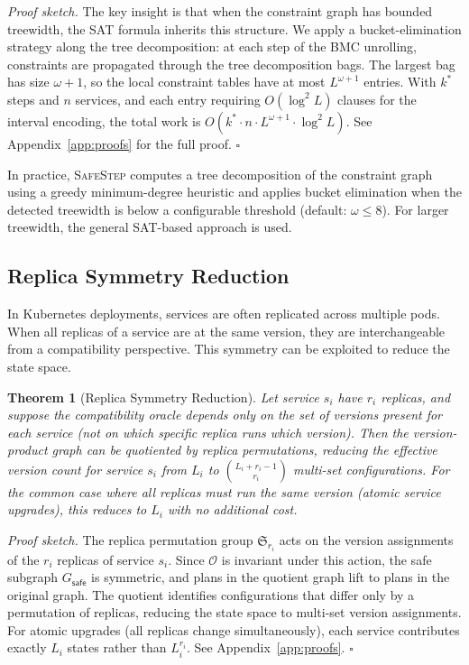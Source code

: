 \documentclass[10pt,twocolumn]{article}
\newtheorem{theorem}{Theorem}
\newcommand{\safestep}{\textsc{SafeStep}}
\begin{document}
\emph{Proof sketch.}
The key insight is that when the constraint graph has bounded
treewidth, the SAT formula inherits this structure. We apply
a bucket-elimination strategy along the tree decomposition:
at each step of the BMC unrolling, constraints are propagated
through the tree decomposition bags. The largest bag has size
$\omega + 1$, so the local constraint tables have at most
$L^{\omega+1}$ entries. With $k^{*}$ steps and $n$ services,
and each entry requiring $O(\log^{2} L)$ clauses for the
interval encoding, the total work is
$O(k^{*} \cdot n \cdot L^{\omega+1} \cdot \log^{2} L)$.
See Appendix~\ref{app:proofs} for the full proof.
\hfill$\square$

In practice, \safestep{} computes a tree decomposition of the
constraint graph using a greedy minimum-degree heuristic and
applies bucket elimination when the detected treewidth is below
a configurable threshold (default: $\omega \leq 8$). For larger
treewidth, the general SAT-based approach is used.

\subsection{Replica Symmetry Reduction}

In Kubernetes deployments, services are often replicated across
multiple pods. When all replicas of a service are at the same
version, they are interchangeable from a compatibility
perspective. This symmetry can be exploited to reduce the
state space.

\begin{theorem}[Replica Symmetry Reduction]
\label{thm:replica}
Let service $s_i$ have $r_i$ replicas, and suppose the
compatibility oracle depends only on the \emph{set} of
versions present for each service (not on which specific
replica runs which version). Then the version-product graph
can be quotiented by replica permutations, reducing the
effective version count for service $s_i$ from $L_i$ to
$\binom{L_i + r_i - 1}{r_i}$ multi-set configurations.
For the common case where all replicas must run the same
version (atomic service upgrades), this reduces to $L_i$
with no additional cost.
\end{theorem}

\emph{Proof sketch.}
The replica permutation group $\mathfrak{S}_{r_i}$ acts on
the version assignments of the $r_i$ replicas of service
$s_i$. Since $\mathcal{O}$ is invariant under this action,
the safe subgraph $G_{\mathsf{safe}}$ is symmetric, and
plans in the quotient graph lift to plans in the original
graph. The quotient identifies configurations that differ
only by a permutation of replicas, reducing the state space
to multi-set version assignments. For atomic upgrades
(all replicas change simultaneously), each service
contributes exactly $L_i$ states rather than $L_i^{r_i}$.
See Appendix~\ref{app:proofs}.
\hfill$\square$
\end{document}
